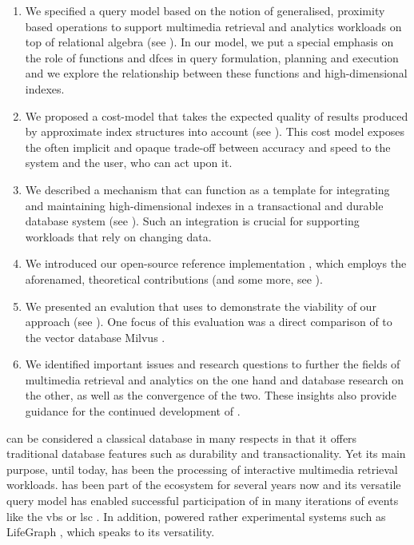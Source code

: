 \begin{enumerate}
    \item We specified a query model based on the notion of generalised, proximity based operations to support multimedia retrieval and analytics workloads on top of relational algebra (see ). In our model, we put a special emphasis on the role of functions and \acrlong{dfc}es in query formulation, planning and execution and we explore the relationship between these functions and high-dimensional indexes.
    \item We proposed a cost-model that takes the expected quality of results produced by approximate index structures into account (see ). This cost model exposes the often implicit and opaque trade-off between accuracy and speed to the system and the user, who can act upon it.
    \item We described a mechanism that can function as a template for integrating and maintaining high-dimensional indexes in a transactional and durable database system (see ). Such an integration is crucial for supporting workloads that rely on changing data.
    \item We introduced our open-source reference implementation \cottontail{}, which employs the aforenamed, theoretical contributions (and some more, see ). 
    \item We presented an evalution that uses \cottontail{} to demonstrate the viability of our approach (see ). One focus of this evaluation was a direct comparison of \cottontail{} to the vector database Milvus \cite{Wang:2021Milvus}.
    \item We identified important issues and research questions to further the fields of multimedia retrieval and analytics on the one hand and database research on the other, as well as the convergence of the two. These insights also provide guidance for the continued development of \cottontail{}.
\end{enumerate}

\cottontail{} can be considered a classical database in many respects in that it offers traditional database features such as durability and transactionality. Yet its main purpose, until today, has been the processing of interactive multimedia retrieval workloads. \cottontail{} has been part of the \vitrivr{} ecosystem \cite{Rossetto:2016Vitrivr,Gasser:2019Multimodal} for several years now and its versatile query model has enabled successful participation of \vitrivr{} in many iterations of events like the \acrshort{vbs} \cite{Rossetto:2019Deep,Sauter:2020Combining,Spiess:2021Competitive,Heller:2022Multi} or \acrshort{lsc} \cite{Spiess:2021Exploring,Heller:2020Interactive,Heller:2021Interactive,Spiess:2022Multi}. In addition, \cottontail{} powered rather experimental systems such as LifeGraph \cite{Rossetto:2021Exploring}, which speaks to its versatility.

